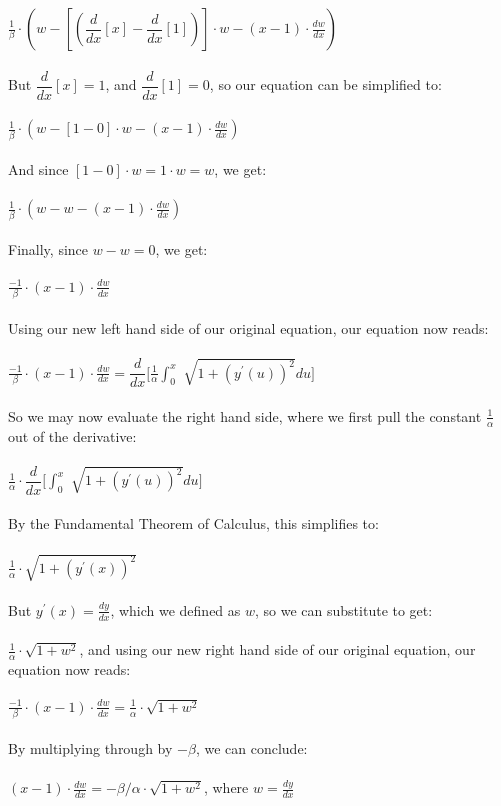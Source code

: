 \documentclass[12pt]{article}
\begin{document}
	$\frac{1}{\beta}\cdot(w - [(\dfrac{d}{dx}[x]-\dfrac{d}{dx}[1])]\cdot w -(x-1)\cdot\frac{dw}{dx} )$
	\\
	\\
	\indent But $\dfrac{d}{dx}[x]=1$, and  $\dfrac{d}{dx}[1]=0$, so our equation can be simplified to:
	\\
	\\
	$\frac{1}{\beta}\cdot(w - [1-0]\cdot w -(x-1)\cdot\frac{dw}{dx} )$
	\\
	\\
	\indent And since $[1-0]\cdot w=1\cdot w=w$, we get:
	\\
	\\
	$\frac{1}{\beta}\cdot(w - w -(x-1)\cdot\frac{dw}{dx} )$
	\\
	\\
	\indent Finally, since $w-w=0$, we get:
	\\
	\\
	$\frac{-1}{\beta}\cdot(x-1)\cdot\frac{dw}{dx}$
	\\
	\\
	\indent Using our new left hand side of our original equation, our equation now reads:
	\\
	\\
	$\frac{-1}{\beta}\cdot(x-1)\cdot\frac{dw}{dx}=\dfrac{d}{dx}[\frac{1}{\alpha}${\Large $\int^x_0$} $ \sqrt{ 1 + (y^{\prime}(u))^{2}}du]$
	\\
	\\
	\indent So we may now evaluate the right hand side, where we first pull the constant $\frac{1}{\alpha}$ out of the derivative:
	\\
	\\
	$\frac{1}{\alpha}\cdot\dfrac{d}{dx}[${\Large $\int^x_0$} $ \sqrt{ 1 + (y^{\prime}(u))^{2}}du]$
	\\
	\\
	\indent By the Fundamental Theorem of Calculus, this simplifies to:
	\\
	\\
	$\frac{1}{\alpha}\cdot\sqrt{ 1 + (y^{\prime}(x))^{2}}$
	\\
	\\
	\indent But $y^{\prime}(x)=\frac{dy}{dx}$, which we defined as $w$, so we can substitute to get:
	\\
	\\
	$\frac{1}{\alpha}\cdot\sqrt{ 1 + w^{2}}$\hspace{0.7cm}, and using our new right hand side of our original equation, our equation now reads:
	\\
	\\
	$\frac{-1}{\beta}\cdot(x-1)\cdot\frac{dw}{dx}=\frac{1}{\alpha}\cdot\sqrt{ 1 + w^{2}}$
	\\
	\\ 
	\indent By multiplying through by $-\beta$, we can conclude:
	\\
	\\
	$(x-1)\cdot\frac{dw}{dx}=-\beta/\alpha\cdot\sqrt{ 1 + w^{2}}$\hspace{1cm}, where $w=\frac{dy}{dx}$
	
\end{document}
